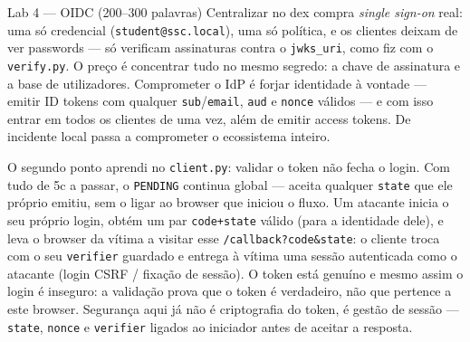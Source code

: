 \documentclass[a4paper,11pt]{article}
\newcommand{\cmd}[1]{\textcolor{sscnblue}{\texttt{#1}}}
\begin{document}
\begin{callout}{Lab 4 --- OIDC (200--300 palavras)}
Centralizar no dex compra \emph{single sign-on} real: uma s\'o credencial
(\cmd{student@ssc.local}), uma s\'o pol\'itica, e os clientes deixam de ver passwords ---
s\'o verificam assinaturas contra o \cmd{jwks\_uri}, como fiz com o \cmd{verify.py}. O
pre\c{c}o \'e concentrar tudo no mesmo segredo: a chave de assinatura e a base de
utilizadores. Comprometer o IdP \'e forjar identidade \`a vontade --- emitir ID tokens com
qualquer \cmd{sub}/\cmd{email}, \cmd{aud} e \cmd{nonce} v\'alidos --- e com isso entrar em
todos os clientes de uma vez, al\'em de emitir access tokens. De incidente local passa a
comprometer o ecossistema inteiro.

O segundo ponto aprendi no \cmd{client.py}: validar o token n\~ao fecha o login. Com tudo
de 5c a passar, o \cmd{PENDING} continua global --- aceita qualquer \cmd{state} que ele
pr\'oprio emitiu, sem o ligar ao browser que iniciou o fluxo. Um atacante inicia o seu
pr\'oprio login, obt\'em um par \cmd{code+state} v\'alido (para a identidade dele), e leva
o browser da v\'itima a visitar esse \cmd{/callback?code\&state}: o cliente troca com o
seu \cmd{verifier} guardado e entrega \`a v\'itima uma sess\~ao autenticada como o
atacante (login CSRF / fixa\c{c}\~ao de sess\~ao). O token est\'a genu\'ino e mesmo assim o
login \'e inseguro: a valida\c{c}\~ao prova que o token \'e verdadeiro, n\~ao que pertence
a este browser. Seguran\c{c}a aqui j\'a n\~ao \'e criptografia do token, \'e gest\~ao de
sess\~ao --- \cmd{state}, \cmd{nonce} e \cmd{verifier} ligados ao iniciador antes de
aceitar a resposta.
\end{callout}
\end{document}
